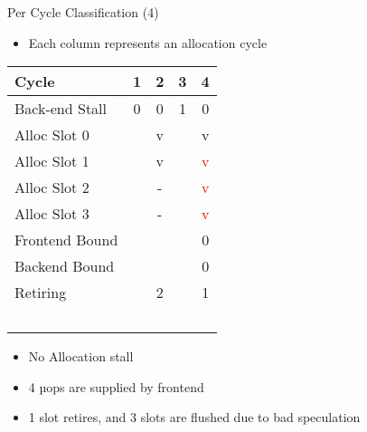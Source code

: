 \documentclass[aspectratio=169,10pt]{beamer}
\begin{document}
\begin{frame}{Per Cycle Classification (4)}
\begin{itemize}
  \item Each column represents an allocation cycle
\end{itemize}

\begin{center}
\begin{tabular}{|l|c|c|c|c|}
\hline
\rowcolor{red!20} Cycle & 1 & 2 & 3 & 4 \\
\hline
\rowcolor{red!20} Back-end Stall & 0 & 0 & 1 & 0 \\
\hline
\rowcolor{greenbar!50} Alloc Slot 0 & & v & & v \\
\hline
\rowcolor{greenbar!50} Alloc Slot 1 & & v & & \textcolor{red}{v} \\
\hline
\rowcolor{greenbar!50} Alloc Slot 2 & & - & & \textcolor{red}{v} \\
\hline
\rowcolor{greenbar!50} Alloc Slot 3 & & - & & \textcolor{red}{v} \\
\hline
\rowcolor{frontendbound} Frontend Bound & & & & 0 \\
\hline
\rowcolor{backendbound} Backend Bound & & & & 0 \\
\hline
\rowcolor{retiring} Retiring & & 2 & & 1 \\
\hline
\rowcolor{badspec} \textcolor{white}{Bad Speculation} & & & & \textcolor{white}{3} \\
\hline
\end{tabular}
\end{center}

\begin{itemize}
  \item No Allocation stall
  \item 4 µops are supplied by frontend
  \item 1 slot retires, and 3 slots are flushed due to bad speculation
\end{itemize}
\end{frame}
\end{document}
